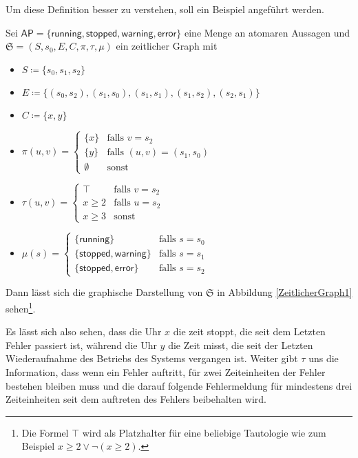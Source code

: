 Um diese Definition besser zu verstehen, soll ein Beispiel angeführt werden.
\begin{example}
	Sei $\mathsf{AP}=\{\mathsf{running},\mathsf{stopped},\mathsf{warning},\mathsf{error}\}$ eine Menge an atomaren Aussagen und $\mathfrak{S}=(S,s_0,E,C,\pi,\tau,\mu)$ ein zeitlicher Graph mit
	\begin{itemize}
		\item $S\coloneqq \{s_0,s_1,s_2\}$
		\item $E\coloneqq\{(s_0,s_2),(s_1,s_0),(s_1,s_1),(s_1,s_2),(s_2,s_1)\}$
		\item $C\coloneqq\{x,y\}$
		\item $\pi(u,v) = \begin{cases}
			\{x\} & \text{falls } v = s_2 \\
			\{y\} & \text{falls } (u,v)=(s_1,s_0) \\
			\emptyset & \text{sonst} \end{cases}$
		\item $\tau(u,v) = \begin{cases}
			\top & \text{falls } v = s_2 \\
			x\geq 2 & \text{falls } u = s_2 \\
			x \geq 3 & \text{sonst}
		\end{cases}$
		\item $\mu(s)=\begin{cases}
			\{\mathsf{running}\} & \text{falls } s = s_0 \\
			\{\mathsf{stopped},\mathsf{warning}\} & \text{falls } s = s_1 \\
			\{\mathsf{stopped},\mathsf{error}\} & \text{falls } s = s_2
		\end{cases}$
	\end{itemize}
	Dann lässt sich die graphische Darstellung von $\mathfrak{S}$ in Abbildung \ref{ZeitlicherGraph1} sehen\footnote{Die Formel $\top$ wird als Platzhalter für eine beliebige Tautologie wie zum Beispiel $x \geq 2 \lor \neg(x\geq 2)$.}.
	
	Es lässt sich also sehen, dass die Uhr $x$ die zeit stoppt, die seit dem Letzten Fehler passiert ist, während die Uhr $y$ die Zeit misst, die seit der Letzten Wiederaufnahme des Betriebs des Systems vergangen ist.
	Weiter gibt $\tau$ uns die Information, dass wenn ein Fehler auftritt, für zwei Zeiteinheiten der Fehler bestehen bleiben muss und die darauf folgende Fehlermeldung für mindestens drei Zeiteinheiten seit dem auftreten des Fehlers beibehalten wird.
\end{example}

